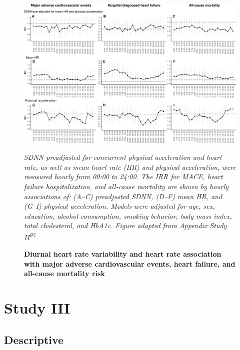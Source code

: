 \documentclass[
  a4paper,
  headsepline=true,
  open=left]{scrbook}
\begin{document}

\begin{figure}

{\centering 

\includegraphics{images/figure_ADD_PRO_risk_by_hour.pdf}

\emph{SDNN preadjusted for concurrent physical acceleration and heart
rate, as well as mean heart rate (HR) and physical acceleration, were
measured hourly from 00:00 to 24:00. The IRR for MACE, heart failure
hospitalization, and all-cause mortality are shown by hourly
associations of: (A--C) preadjusted SDNN, (D--F) mean HR, and (G--I)
physical acceleration. Models were adjusted for age, sex, education,
alcohol consumption, smoking behavior, body mass index, total
cholesterol, and HbA1c. Figure adapted from Appendix Study
II\textsuperscript{95}}

}

\caption{\label{fig-ADD_PRO_risk_by_hour}\textbf{Diurnal heart rate
variability and heart rate association with major adverse cardiovascular
events, heart failure, and all-cause mortality risk}}

\end{figure}

\restoregeometry

\hypertarget{study-iii}{%
\section{Study III}\label{study-iii}}

\hypertarget{descriptive-2}{%
\subsection{Descriptive}\label{descriptive-2}}
\end{document}
